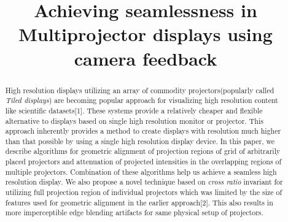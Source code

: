 \documentclass[conference]{/home/pranav/Desktop/Publication_work/latex_class_files/IEEEtran}
\begin{document}
\title{Achieving seamlessness in Multiprojector displays using camera feedback}





\author{
}
    



\maketitle

\begin{abstract}
High resolution displays utilizing an array of commodity projectors(popularly called \textit{Tiled displays}) are becoming popular approach for visualizing high resolution content like scientific datasets[1]. These systems provide a relatively cheaper and flexible alternative to displays based on single high resolution monitor or projector. This approach inherently provides a method to create displays with resolution much higher than that possible by using a single high resolution display device. In this paper, we describe algorithms for geometric alignment of projection regions of grid of arbitrarily placed projectors and attenuation of projected intensities in the overlapping regions of multiple projectors. Combination of these algorithms help us achieve a seamless high resolution display. We also propose a novel technique based on \textit{cross ratio} invariant for utilizing full projection region of individual projectors which was limited by the size of features used for geometric alignment in the earlier approach[2]. This also results in more imperceptible edge blending artifacts for same physical setup of projectors.
\end{abstract}
\end{document}
